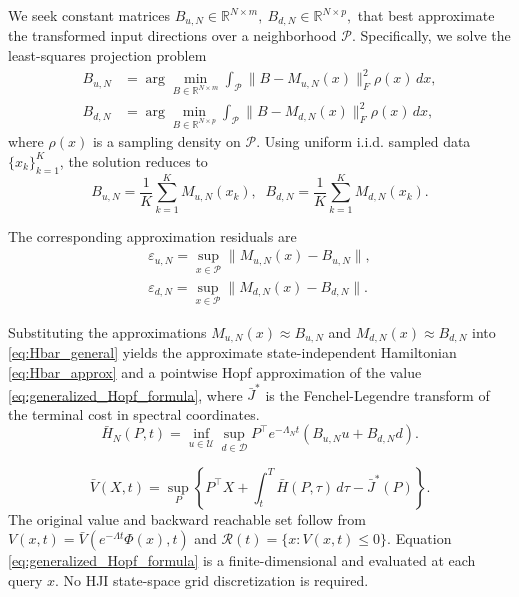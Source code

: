 \documentclass[letterpaper, 10 pt, conference]{ieeeconf}
\theoremstyle{plain}
\theoremstyle{definition}
\begin{document}
We seek constant matrices
\(
B_{u,N}\in\mathbb R^{N\times m},
\
B_{d,N}\in\mathbb R^{N\times p},
\)
that best approximate the transformed input directions
over a neighborhood $\mathcal P$.
Specifically, we solve the least-squares projection problem
\begin{equation}
    \begin{aligned}
        B_{u,N}
        &=
        \arg\min_{B\in\mathbb R^{N\times m}}
        \int_{\mathcal P}
        \|B-M_{u,N}(x)\|_F^2 \rho(x)\,dx,
        \\
        B_{d,N}
        &=
        \arg\min_{B\in\mathbb R^{N\times p}}
        \int_{\mathcal P}
        \|B-M_{d,N}(x)\|_F^2 \rho(x)\,dx,
    \end{aligned} \label{eq:BuBd_fit}
\end{equation}
where $\rho(x)$ is a sampling density on $\mathcal P$. Using uniform i.i.d. sampled data $\{x_k\}_{k=1}^K$, the solution reduces to
\begin{equation}
    B_{u,N}=
    \frac1K\sum_{k=1}^K M_{u,N}(x_k),
    \;\;
    B_{d,N}=
    \frac1K\sum_{k=1}^K M_{d,N}(x_k). \label{eq:BuBd_sample_approx}
\end{equation}

The corresponding approximation residuals are 
\begin{equation}
    \begin{aligned}
        \varepsilon_{u,N}
        =
        \sup_{x\in\mathcal P}
        \|M_{u,N}(x)-B_{u,N}\|,
        \\
        \varepsilon_{d,N}
        =
        \sup_{x\in\mathcal P}
        \|M_{d,N}(x)-B_{d,N}\|.
    \end{aligned}
    \label{eq:rigidity_residual}
\end{equation}

Substituting the approximations
$M_{u,N}(x)\approx B_{u,N}$ and $M_{d,N}(x)\approx B_{d,N}$
into \eqref{eq:Hbar_general} yields the approximate
state-independent Hamiltonian \eqref{eq:Hbar_approx} and a pointwise Hopf approximation of the value \eqref{eq:generalized_Hopf_formula}, where $\bar J^*$ is the  Fenchel-Legendre transform of the terminal cost in spectral coordinates.
\begin{equation}
    \bar H_N(P,t)
    =
    \inf_{u\in\mathcal U}
    \sup_{d\in\mathcal D}
    P^\top e^{-\Lambda_N t}
    (B_{u,N} u+B_{d,N} d).
    \label{eq:Hbar_approx}
\end{equation}

\begin{equation}\label{eq:generalized_Hopf_formula}
    \bar V(X,t)
    =
    \sup_P
    \left\{
    P^\top X
    +
    \int_t^T \bar H(P,\tau)\,d\tau
    -
    \bar J^*(P)
    \right\}.
\end{equation}
The original value and backward reachable set follow from $V(x,t)=\bar V(e^{-\Lambda t}\Phi(x),t)$ and $\mathcal R(t)=\{x:V(x,t)\le0\}$. 
Equation \eqref{eq:generalized_Hopf_formula} is a finite-dimensional and evaluated at each query $x$. No HJI state-space grid discretization is required.
\end{document}
